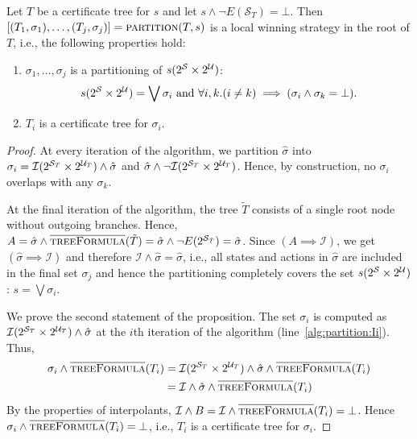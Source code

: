 \begin{proposition}\label{prop:partition}
    Let $T$ be a certificate tree for $s$ and let $s \land \lnot E(\mathcal{S}_T) = \bot$. Then $[(T_1, \sigma_1),\ldots,(T_j, \sigma_j)] = \textsc{partition}(T, s)$ is a local winning strategy in the root of $T$, i.e., the following properties hold:
    \begin{enumerate}
        \item $\sigma_1 ,\ldots, \sigma_j$ is a partitioning of
            $s(2^{\mathcal{S}} \times 2^{\mathcal{U}})$: $$s(2^{\mathcal{S}} \times 2^{\mathcal{U}}) = \bigvee \sigma_i \text{ and } \forall i, k. (i \neq k) \implies (\sigma_i \land \sigma_k = \bot).$$
        \item $T_i$ is a certificate tree for $\sigma_i$.
    \end{enumerate}
\end{proposition}
\begin{proof}
    At every iteration of the algorithm, we partition $\hat{\sigma}$ into $\sigma_i = \mathcal{I}(2^{\mathcal{S}_T} \times 2^{\mathcal{U}_T}) \land \hat{\sigma}$ and $\hat{\sigma} \land \neg\mathcal{I}(2^{\mathcal{S}_T} \times 2^{\mathcal{U}_T})$. Hence, by construction, no $\sigma_i$ overlaps with any $\sigma_k$.

    At the final iteration of the algorithm, the tree $\tilde{T}$ consists of a single root node without outgoing branches.  Hence, $A = \hat{\sigma} \land \textsc{$\overline{\mbox{treeFormula}}$}(\tilde{T}) = \hat{\sigma} \land \neg E(2^{\mathcal{S}_{\tilde{T}}}) = \hat{\sigma}$.  Since $(A \implies \mathcal{I})$, we get $(\hat{\sigma} \implies \mathcal{I})$ and therefore $\mathcal{I} \land \hat{\sigma} = \hat{\sigma}$, i.e., all states and actions in $\hat{\sigma}$ are included in the final set $\sigma_j$ and hence the partitioning completely covers the set $s(2^{\mathcal{S}} \times 2^{\mathcal{U}})$: $s=\bigvee \sigma_i$.

    We prove the second statement of the proposition.  The set $\sigma_i$ is computed as $\mathcal{I}(2^{\mathcal{S}_T} \times 2^{\mathcal{U}_T}) \land \hat{\sigma}$ at the $i$th iteration of the algorithm (line~\ref{alg:partition:Ii}).
    Thus, 
    \begin{align*}
        \sigma_i \land \textsc{$\overline{\mbox{treeFormula}}$}(T_i) ={}& \mathcal{I}(2^{\mathcal{S}_T} \times 2^{\mathcal{U}_T}) \land \hat{\sigma} \land \textsc{$\overline{\mbox{treeFormula}}$}(T_i) \\
        ={}& \mathcal{I} \land \hat{\sigma} \land \textsc{$\overline{\mbox{treeFormula}}$}(T_i)
    \end{align*}
    By the properties of interpolants, $\mathcal{I} \land B = \mathcal{I} \land \textsc{$\overline{\mbox{treeFormula}}$}(T_i) = \bot$.
    Hence $\sigma_i \land \textsc{$\overline{\mbox{treeFormula}}$}(T_i) = \bot$, i.e., $T_i$ is a certificate tree for $\sigma_i$.
\end{proof}

